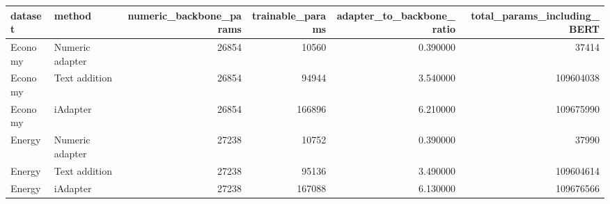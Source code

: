 \begin{tabular}{llrrrr}
\toprule
dataset & method & numeric\_backbone\_params & trainable\_params & adapter\_to\_backbone\_ratio & total\_params\_including\_BERT \\
\midrule
Economy & Numeric adapter & 26854 & 10560 & 0.390000 & 37414 \\
Economy & Text addition & 26854 & 94944 & 3.540000 & 109604038 \\
Economy & iAdapter & 26854 & 166896 & 6.210000 & 109675990 \\
Energy & Numeric adapter & 27238 & 10752 & 0.390000 & 37990 \\
Energy & Text addition & 27238 & 95136 & 3.490000 & 109604614 \\
Energy & iAdapter & 27238 & 167088 & 6.130000 & 109676566 \\
\bottomrule
\end{tabular}
